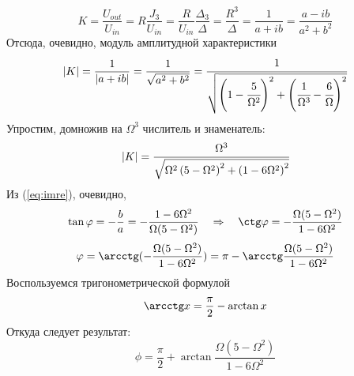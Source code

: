 \begin{equation}
	\label{eq:imre}
	K=\frac{U_{out}}{U_{in}}=R\frac{J_3}{U_{in}}=\frac{R}{U_{in}}\frac{\Delta_3}{\Delta}=\frac{R^3}{\Delta}=\frac{1}{a+ib}=\frac{a-ib}{a^2+b^2}
\end{equation}
Отсюда, очевидно, модуль амплитудной характеристики
\begin{equation}
	|K|=\frac{1}{|a+ib|}=\frac{1}{\sqrt{a^2+b^2}}
	=
	\cfrac{1}{
		\sqrt{
			\left(
			1
			-\cfrac{5}{\Omega^2}
			\right)^2
			+
			\left(
			\cfrac{1}{\Omega^3}
			-\cfrac{6}{\Omega}
			\right)^2
		}}
\end{equation}
Упростим, домножив на $\Omega^3$ числитель и знаменатель:
\begin{equation}
	|K|=
	\cfrac{\Omega^3}{
		\sqrt{
			\Omega^2\left(
			5-\Omega^2
			\right)^2
			+
			\left(
			1
			-{6}{\Omega}^2
			\right)^2
		}}
\end{equation}
Из (\ref{eq:imre}), очевидно,
\begin{equation}
	\tan\phi=-\frac{b}{a}=-\frac{1-6\Omega^2}{\Omega(5-\Omega^2)}
	\quad\Rightarrow\quad
	\ctg\phi=-\frac{\Omega(5-\Omega^2)}{1-6\Omega^2}
\end{equation}
\begin{equation}
	\phi=\arcctg(-\frac{\Omega(5-\Omega^2)}{1-6\Omega^2})=
	\pi-\arcctg\frac{\Omega(5-\Omega^2)}{1-6\Omega^2}
\end{equation}
Воспользуемся тригонометрической формулой
\begin{equation}
	\arcctg x = \frac{\pi}{2}-\arctan x
\end{equation}
Откуда следует результат:
\begin{equation}
	\phi=\frac{\pi}{2}+\arctan\frac{\Omega(5-\Omega^2)}{1-6\Omega^2}
\end{equation}


